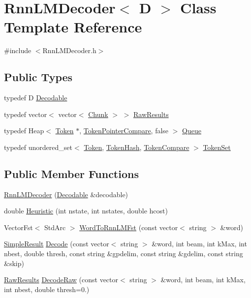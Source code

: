 \hypertarget{class_rnn_l_m_decoder}{}\section{Rnn\+L\+M\+Decoder$<$ D $>$ Class Template Reference}
\label{class_rnn_l_m_decoder}


{\ttfamily \#include $<$Rnn\+L\+M\+Decoder.\+h$>$}

\subsection*{Public Types}
\begin{DoxyCompactItemize}
\item 
typedef D \hyperlink{class_rnn_l_m_decoder_a96cefe4263b117d36af4220f6716a788}{Decodable}
\item 
typedef vector$<$ vector$<$ \hyperlink{class_chunk}{Chunk} $>$ $>$ \hyperlink{class_rnn_l_m_decoder_af7ccd067ad2bf3f6a77183e312df3900}{Raw\+Results}
\item 
typedef Heap$<$ \hyperlink{class_token}{Token} $\ast$, \hyperlink{class_token_pointer_compare}{Token\+Pointer\+Compare}, false $>$ \hyperlink{class_rnn_l_m_decoder_ab653813a7dbee6c9ea6948f414d2b128}{Queue}
\item 
typedef unordered\+\_\+set$<$ \hyperlink{class_token}{Token}, \hyperlink{class_token_hash}{Token\+Hash}, \hyperlink{class_token_compare}{Token\+Compare} $>$ \hyperlink{class_rnn_l_m_decoder_a64098e6f9fe4998943ef0d20da2fe747}{Token\+Set}
\end{DoxyCompactItemize}
\subsection*{Public Member Functions}
\begin{DoxyCompactItemize}
\item 
\hyperlink{class_rnn_l_m_decoder_a0a57390cc6c638a482c0cd616c9f6aaf}{Rnn\+L\+M\+Decoder} (\hyperlink{class_rnn_l_m_decoder_a96cefe4263b117d36af4220f6716a788}{Decodable} \&decodable)
\item 
double \hyperlink{class_rnn_l_m_decoder_adfbb660643993579694cfcfe1a715fe3}{Heuristic} (int nstate, int nstates, double hcost)
\item 
Vector\+Fst$<$ Std\+Arc $>$ \hyperlink{class_rnn_l_m_decoder_afe4e4d5cb610b67ea0863dc2de8bcb17}{Word\+To\+Rnn\+L\+M\+Fst} (const vector$<$ string $>$ \&word)
\item 
\hyperlink{class_simple_result}{Simple\+Result} \hyperlink{class_rnn_l_m_decoder_a2154b3965af658c38969f763ce37f7ff}{Decode} (const vector$<$ string $>$ \&word, int beam, int k\+Max, int nbest, double thresh, const string \&gpdelim, const string \&gdelim, const string \&skip)
\item 
\hyperlink{class_rnn_l_m_decoder_af7ccd067ad2bf3f6a77183e312df3900}{Raw\+Results} \hyperlink{class_rnn_l_m_decoder_ad22f3912be851cffd68642f588604a7c}{Decode\+Raw} (const vector$<$ string $>$ \&word, int beam, int k\+Max, int nbest, double thresh=0.)
\end{DoxyCompactItemize}

